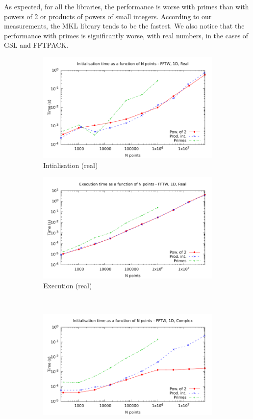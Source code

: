 \documentclass[12pt, a4paper]{article}
\begin{document}
As expected, for all the libraries, the performance is worse with primes than with powers of 2 or products of powers of small integers. According to our measurements, the MKL library tends to be the fastest. We also notice that the performance with primes is significantly worse, with real numbers, in the cases of GSL and FFTPACK.
\begin{figure}[H]
\captionsetup{width=0.8\linewidth}
\centering
\begin{subfigure}{.5\textwidth}
\centering
\includegraphics[width=.9\linewidth]{graphs/1d-fftw-init-r.pdf}
\caption{Intialisation (real)}
\label{1DFFTWRI}
\end{subfigure}%
\begin{subfigure}{.5\textwidth}
\centering
\includegraphics[width=.9\linewidth]{graphs/1d-fftw-exec-r.pdf}
\caption{Execution (real)}
\label{1DFFTWR}
\end{subfigure}\\
\begin{subfigure}{.5\textwidth}
\centering
\includegraphics[width=.9\linewidth]{graphs/1d-fftw-init-c.pdf}

\end{subfigure}
\end{figure}
\end{document}
